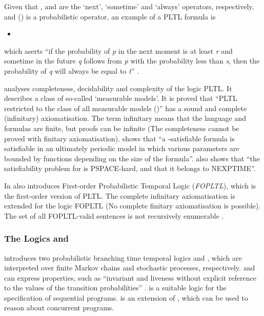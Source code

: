\documentclass[11pt]{article}
\begin{document}
Given that ,  and  are the `next', `sometime' and `always' operators, respectively, and  () is a probabilistic operator, an example of a PLTL formula is  \cite{Ogn06}

\begin{itemize}
\item  \end{itemize}

\noindent which aserts ``if the probability of \textit{p} in the next moment is at least \textit{r} and sometime in the future \textit{q} follows from \textit{p} with the probability less than \textit{s}, then the probability of \textit{q} will always be equal to \textit{t}''  \cite{Ogn06}.

\cite{Ogn06} analyses completeness, decidability and complexity of the logic PLTL. It describes a class of so-called `measurable models'. It is proved that ``PLTL restricted to the class of all measurable models ()'' has a sound and complete (infinitary) axiomatisation. The term infinitary means that the language and formulas are finite, but proofs can be infinite (The completeness cannot be proved with finitary axiomatisation). \cite{Ogn06}  shows that ``a -satisfiable formula is satisfiable in an ultimately periodic model in which various parameters are bounded by functions depending on the size of the formula''. \cite{Ogn06} also shows that ``the satisfiability problem for   is PSPACE-hard, and that it belongs to NEXPTIME''.

In \cite{Ogn06} also introduces First-order Probabilistic Temporal Logic (\textit{FOPLTL}), which is the first-order version of PLTL. The complete infinitary axiomatisation is extended for the logic FOPLTL (No complete finitary axiomatisation is possible). The set of all FOPLTL-valid sentences is not recursively enumerable \cite{GHR94}.


\subsubsection{The Logics  and }

\cite{HS84} introduces two probabilistic branching time temporal logics   and , which are interpreted over finite Markov chains and stochastic processes, respectively.  and  can express properties, such as 
``invariant and liveness without explicit reference to the values of the transition probabilities'' \cite{HS84}.  is a suitable logic for the specification of sequential programs.  is an extension of , which can be used to reason about concurrent programs. 
\end{document}
